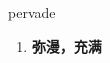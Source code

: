 
\begin{frame}
{\huge pervade}
\begin{center}
\begin{enumerate}\Large
  \item \textbf{弥漫，充满}
\end{enumerate}
\end{center}
\end{frame}
